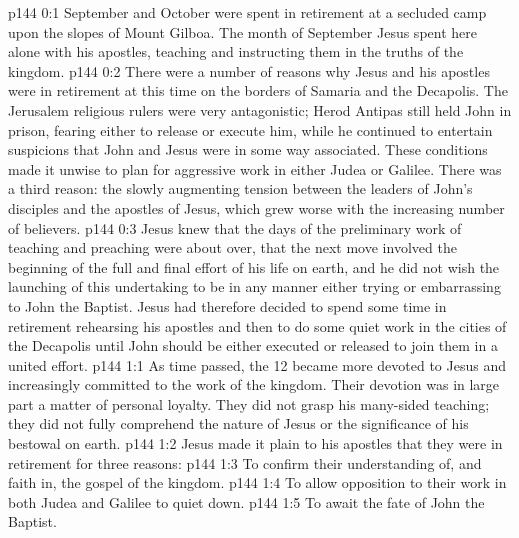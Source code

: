 \author{Midwayer Commission}
\vs p144 0:1 September and October were spent in retirement at a secluded camp upon the slopes of Mount Gilboa. The month of September Jesus spent here alone with his apostles, teaching and instructing them in the truths of the kingdom.
\vs p144 0:2 There were a number of reasons why Jesus and his apostles were in retirement at this time on the borders of Samaria and the Decapolis. The Jerusalem religious rulers were very antagonistic; Herod Antipas still held John in prison, fearing either to release or execute him, while he continued to entertain suspicions that John and Jesus were in some way associated. These conditions made it unwise to plan for aggressive work in either Judea or Galilee. There was a third reason: the slowly augmenting tension between the leaders of John’s disciples and the apostles of Jesus, which grew worse with the increasing number of believers.
\vs p144 0:3 Jesus knew that the days of the preliminary work of teaching and preaching were about over, that the next move involved the beginning of the full and final effort of his life on earth, and he did not wish the launching of this undertaking to be in any manner either trying or embarrassing to John the Baptist. Jesus had therefore decided to spend some time in retirement rehearsing his apostles and then to do some quiet work in the cities of the Decapolis until John should be either executed or released to join them in a united effort.
\vs p144 1:1 As time passed, the 12 became more devoted to Jesus and increasingly committed to the work of the kingdom. Their devotion was in large part a matter of personal loyalty. They did not grasp his many\hyp{}sided teaching; they did not fully comprehend the nature of Jesus or the significance of his bestowal on earth.
\vs p144 1:2 Jesus made it plain to his apostles that they were in retirement for three reasons:
\vs p144 1:3 \bibnobreakspace To confirm their understanding of, and faith in, the gospel of the kingdom.
\vs p144 1:4 \bibnobreakspace To allow opposition to their work in both Judea and Galilee to quiet down.
\vs p144 1:5 \bibnobreakspace To await the fate of John the Baptist.
